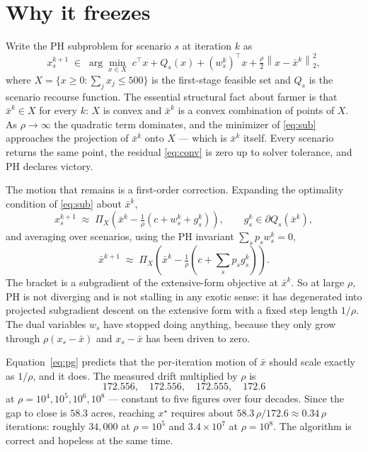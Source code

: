 \documentclass[11pt]{article}
\newcommand{\norm}[1]{\left\lVert #1 \right\rVert}
\newcommand{\xbar}{\bar{x}}
\begin{document}
\section{Why it freezes}

Write the PH subproblem for scenario $s$ at iteration $k$ as
\begin{equation}
  \label{eq:sub}
  x_s^{k+1} \;\in\; \arg\min_{x \in X}\;
    c^\top x + Q_s(x) + (w_s^k)^\top x + \tfrac{\rho}{2}\norm{x - \xbar^k}_2^2 ,
\end{equation}
where $X = \{x \ge 0 : \sum_j x_j \le 500\}$ is the first-stage feasible set and
$Q_s$ is the scenario recourse function.  The essential structural fact about
farmer is that $\xbar^k \in X$ for every $k$: $X$ is convex and $\xbar^k$ is a
convex combination of points of $X$.  As $\rho \to \infty$ the quadratic term
dominates, and the minimizer of \eqref{eq:sub} approaches the projection of
$\xbar^k$ onto $X$ --- which is $\xbar^k$ itself.  Every scenario returns the
same point, the residual \eqref{eq:conv} is zero up to solver tolerance, and PH
declares victory.

The motion that remains is a first-order correction.  Expanding the optimality
condition of \eqref{eq:sub} about $\xbar^k$,
\begin{equation}
  \label{eq:step}
  x_s^{k+1} \;\approx\; \Pi_X\!\left(\xbar^k - \tfrac{1}{\rho}\left(c + w_s^k + g_s^k\right)\right),
  \qquad g_s^k \in \partial Q_s(\xbar^k),
\end{equation}
and averaging over scenarios, using the PH invariant $\sum_s p_s w_s^k = 0$,
\begin{equation}
  \label{eq:pg}
  \xbar^{k+1} \;\approx\; \Pi_X\!\left(\xbar^k - \tfrac{1}{\rho}\left(c + \textstyle\sum_s p_s g_s^k\right)\right).
\end{equation}
The bracket is a subgradient of the extensive-form objective at $\xbar^k$.  So
at large $\rho$, PH is not diverging and is not stalling in any exotic sense:
it has degenerated into projected subgradient descent on the extensive form
with a fixed step length $1/\rho$.  The dual variables $w_s$ have stopped doing
anything, because they only grow through $\rho(x_s - \xbar)$ and $x_s - \xbar$
has been driven to zero.

Equation~\eqref{eq:pg} predicts that the per-iteration motion of $\xbar$ should
scale exactly as $1/\rho$, and it does.  The measured drift multiplied by
$\rho$ is
\[
  172.556,\quad 172.556,\quad 172.555,\quad 172.6
\]
at $\rho = 10^4, 10^5, 10^6, 10^8$ --- constant to five figures over four
decades.  Since the gap to close is $58.3$ acres, reaching $x^\star$ requires
about $58.3\,\rho / 172.6 \approx 0.34\,\rho$ iterations: roughly $34{,}000$ at
$\rho = 10^5$ and $3.4\times10^7$ at $\rho = 10^8$.  The algorithm is correct
and hopeless at the same time.
\end{document}
